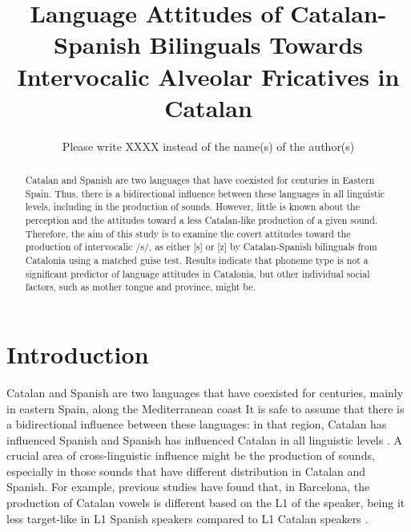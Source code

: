 \documentclass[
  a4paper,
  11pt,
  twocolumn]{article}
\author{}
\date{\vspace{-2.5em}}
\begin{document}
\title{Language Attitudes of Catalan-Spanish Bilinguals Towards Intervocalic Alveolar Fricatives in Catalan}
\author{Please write XXXX instead of the name(s) of the author(s)}


\maketitle

\begin{abstract}
Catalan and Spanish are two languages that have coexisted for centuries in Eastern Spain. Thus, there is a bidirectional influence between these languages in all linguistic levels, including in the production of sounds. However, little is known about the perception and the attitudes toward a less Catalan-like production of a given sound. Therefore, the aim of this study is to examine the covert attitudes toward the production of intervocalic /s/, as either [s] or [z] by Catalan-Spanish bilinguals from Catalonia using a matched guise test. Results indicate that phoneme type is not a significant predictor of language attitudes in Catalonia, but other individual social factors, such as mother tongue and province, might be.
\end{abstract}



\section{Introduction}

Catalan and Spanish are two languages that have coexisted for centuries,
mainly in eastern Spain, along the Mediterranean coast
\cite{hualde_1992} It is safe to assume that there is a bidirectional
influence between these languages: in that region, Catalan has
influenced Spanish and Spanish has influenced Catalan in all linguistic
levels \cite{davidson_2014} \cite{davidson_2015}. A crucial area of
cross-linguistic influence might be the production of sounds, especially
in those sounds that have different distribution in Catalan and Spanish.
For example, previous studies have found that, in Barcelona, the
production of Catalan vowels is different based on the L1 of the
speaker, being it less target-like in L1 Spanish speakers compared to L1
Catalan speakers \cite{pallier_bosch_sebastian_galles_1997}.
\end{document}
